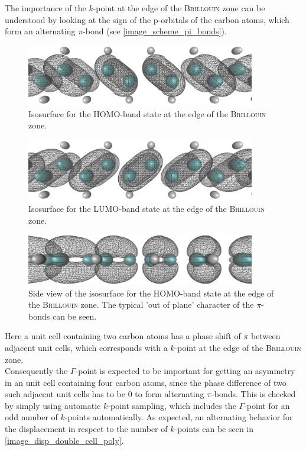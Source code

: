 The importance of the $k$-point at the edge of the \textsc{Brillouin} zone can be understood by looking at the sign of the p-orbitals of the carbon atoms, which form an alternating $\pi$-bond (see \cref{image_scheme_pi_bonds}). 
\begin{figure}[!b]
	\centering
	\includegraphics[width = 10cm]{Images/polyacetylene/wavefunctions/Homo}
	\caption{Isosurface for the HOMO-band state at the edge of the \textsc{Brillouin} zone.}
	\label{image_homo1}
\end{figure}
\begin{figure}[!b]
	\centering
	\includegraphics[width = 10cm]{Images/polyacetylene/wavefunctions/LUMO}
	\caption{Isosurface for the LUMO-band state at the edge of the \textsc{Brillouin} zone.}
	\label{image_lumo1}
\end{figure}
\begin{figure}[!b]
	\centering
	\includegraphics[width = 10cm]{Images/polyacetylene/wavefunctions/HOMO_Side_View}
	\caption{Side view of the isosurface for the HOMO-band state at the edge of the \textsc{Brillouin} zone. The typical 'out of plane' character of the $\pi$-bonds can be seen.}
	\label{image_homo1_side_view}
\end{figure}
Here a unit cell containing two carbon atoms has a phase shift of $\pi$ between adjacent unit cells, which corresponds with a $k$-point at the edge of the \textsc{Brillouin} zone.\\
Consequently the $\Gamma$-point is expected to be important for getting an asymmetry in an unit cell containing four carbon atoms, since the phase difference of two such adjacent unit cells has to be $0$ to form alternating $\pi$-bonds. This is checked by simply using automatic $k$-point sampling, which includes the $\Gamma$-point for an odd number of $k$-points automatically. As expected, an alternating behavior for the displacement in respect to the number of $k$-points can be seen in \cref{image_disp_double_cell_poly}.\\
